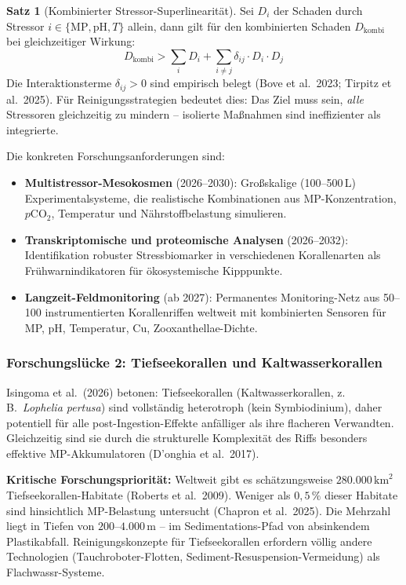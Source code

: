 ﻿\documentclass[12pt,a4paper]{article}
\theoremstyle{definition}
\newtheorem{satz}{Satz}
\theoremstyle{remark}
\begin{document}
\begin{satz}[Kombinierter Stressor-Superlinearität]
Sei $D_i$ der Schaden durch Stressor $i \in \{\text{MP}, \text{pH}, T\}$ allein,
dann gilt für den kombinierten Schaden $D_{\text{kombi}}$ bei gleichzeitiger
Wirkung:
\begin{equation}
  D_{\text{kombi}} > \sum_i D_i + \sum_{i \neq j} \delta_{ij} \cdot D_i \cdot D_j
  \label{eq:superlinear_damage}
\end{equation}
Die Interaktionsterme $\delta_{ij} > 0$ sind empirisch belegt (Bove et al.\ 2023;
Tirpitz et al.\ 2025). Für Reinigungsstrategien bedeutet dies: Das Ziel muss sein,
\textit{alle} Stressoren gleichzeitig zu mindern -- isolierte Maßnahmen sind
ineffizienter als integrierte.
\end{satz}

Die konkreten Forschungsanforderungen sind:
\begin{itemize}[leftmargin=*, noitemsep]
  \item \textbf{Multistressor-Mesokosmen} (2026--2030): Großskalige (100--500\,L)
    Experimentalsysteme, die realistische Kombinationen aus MP-Konzentration,
    $p$CO$_2$, Temperatur und Nährstoffbelastung simulieren.
  \item \textbf{Transkriptomische und proteomische Analysen} (2026--2032):
    Identifikation robuster Stressbiomarker in verschiedenen Korallenarten als
    Frühwarnindikatoren für ökosystemische Kipppunkte.
  \item \textbf{Langzeit-Feldmonitoring} (ab 2027): Permanentes Monitoring-Netz
    aus 50--100 instrumentierten Korallenriffen weltweit mit kombinierten
    Sensoren für MP, pH, Temperatur, Cu, Zooxanthellae-Dichte.
\end{itemize}

\subsubsection{Forschungslücke 2: Tiefseekorallen und Kaltwasserkorallen}

Isingoma et al.\ (2026) betonen: Tiefseekorallen (Kaltwasserkorallen, z.\,B.\
\textit{Lophelia pertusa}) sind vollständig heterotroph (kein Symbiodinium),
daher potentiell für alle post-Ingestion-Effekte anf\"alliger als ihre flacheren
Verwandten. Gleichzeitig sind sie durch die strukturelle Komplexität des Riffs
besonders effektive MP-Akkumulatoren (D'onghia et al.\ 2017).

\begin{mdframed}[backgroundcolor=lightgray, linecolor=alertred, linewidth=1.2pt]
\textbf{Kritische Forschungspriorität:} Weltweit gibt es schätzungsweise
$280{.}000\,\text{km}^2$ Tiefseekorallen-Habitate (Roberts et al.\ 2009).
Weniger als $0{,}5\,\%$ dieser Habitate sind hinsichtlich MP-Belastung
untersucht (Chapron et al.\ 2025). Die Mehrzahl liegt in Tiefen von
$200$--$4.000$\,m -- im Sedimentations-Pfad von absinkendem Plastikabfall.
Reinigungskonzepte für Tiefseekorallen erfordern völlig andere Technologien
(Tauchroboter-Flotten, Sediment-Resuspension-Vermeidung) als Flachwassr-Systeme.
\end{mdframed}
\end{document}
